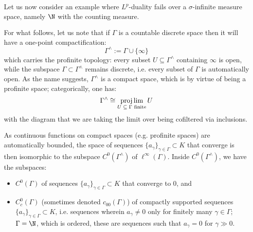         Let us now consider an example where $L^p$-duality fails over a $\sigma$-infinite measure space, namely $\N$ with the counting measure.
        \begin{remark}
            For what follows, let us note that if $\Gamma$ is a countable discrete space then it will have a one-point compactification:
                $$\Gamma^{\wedge} := \Gamma \cup \{\infty\}$$
            which carries the profinite topology: every subset $U \subseteq \Gamma^{\wedge}$ containing $\infty$ is open, while the subspace $\Gamma \subset \Gamma^{\wedge}$ remains discrete, i.e. every subset of $\Gamma$ is automatically open. As the name suggests, $\Gamma^{\wedge}$ is a compact space, which is by virtue of being a profinite space; categorically, one has:
                $$\Gamma^{\wedge} \cong \projlim_{\text{$U \subseteq \Gamma$ finite}} U$$
            with the diagram that we are taking the limit over being cofiltered via inclusions.

            As continuous functions on compact spaces (e.g. profinite spaces) are automatically bounded, the space of sequences $\{a_{\gamma}\}_{\gamma \in \Gamma} \subset K$ that converge is then isomorphic to the subspace $C^0(\Gamma^{\wedge})$ of $\ell^{\infty}(\Gamma)$. Inside $C^0(\Gamma^{\wedge})$, we have the subspaces:
            \begin{itemize}
                \item $C^0(\Gamma)$ of sequences $\{a_{\gamma}\}_{\gamma \in \Gamma} \subset K$ that converge to $0$, and 
                \item $C^0_c(\Gamma)$ (sometimes denoted $c_{00}(\Gamma)$) of compactly supported sequences $\{a_{\gamma}\}_{\gamma \in \Gamma} \subset K$, i.e. sequences wherein $a_{\gamma} \not = 0$ only for finitely many $\gamma \in \Gamma$; $\Gamma = \N$, which is ordered, these are sequences such that $a_{\gamma} = 0$ for $\gamma \gg 0$. 
            \end{itemize}
        \end{remark}
            
